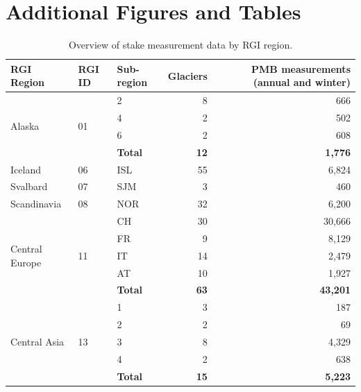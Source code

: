 \documentclass[draft]{agujournal2019}
\begin{document}
\section{Additional Figures and Tables}
\begin{table}[ht]
\centering
\caption{Overview of stake measurement data by RGI region.}
\label{tab:region_overview}
\begin{tabular}{lllrr}
\toprule
RGI Region & RGI ID & Sub-region & Glaciers & PMB measurements (annual and winter) \\
\midrule
\multirow{4}{*}{Alaska} & \multirow{4}{*}{01}
  & 2 & 8 & 666 \\
  & & 4 & 2 & 502 \\
  & & 6 & 2 & 608 \\
  & & \textbf{Total} & \textbf{12} & \textbf{1,776} \\
\midrule
Iceland         & 06 & ISL & 55 & 6,824 \\
\midrule
Svalbard        & 07 & SJM & 3  & 460 \\
\midrule
Scandinavia     & 08 & NOR & 32 & 6,200 \\
\midrule
\multirow{5}{*}{Central Europe} & \multirow{5}{*}{11}
  & CH & 30 & 30,666 \\
  & & FR & 9  & 8,129 \\
  & & IT & 14 & 2,479 \\
  & & AT & 10 & 1,927 \\
  & & \textbf{Total} & \textbf{63} & \textbf{43,201} \\
\midrule
\multirow{5}{*}{Central Asia} & \multirow{5}{*}{13}
  & 1 & 3 & 187 \\
  & & 2 & 2 & 69 \\
  & & 3 & 8 & 4,329 \\
  & & 4 & 2 & 638 \\
  & & \textbf{Total} & \textbf{15} & \textbf{5,223} \\
\bottomrule
\end{tabular}
\end{table}
\end{document}
